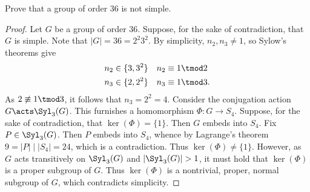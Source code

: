 \documentclass[12pt]{article}
\begin{document}
\begin{homeworkProblem}
  Prove that a group of order $36$ is not simple.

  \begin{proof}
    Let $ G $ be a group of order $ 36 $. Suppose, for the sake of contradiction, that $ G $ is simple. Note that $ |G|=36 = 2^2 3^2 $. By simplicity, $ n_{2},n_{3}\neq 1 $, so Sylow's theorems give 
    \begin{align*}
      n_{2} \in\{3,3^2\} &\quad n_{2}\equiv 1\tmod 2\\
      n_{3} \in\{2,2^2\} &\quad n_{3}\equiv 1\tmod 3.
    \end{align*}
    As $ 2\not\equiv 1\tmod 3 $, it follows that $ n_{3} = 2^{2}= 4 $. Consider the conjugation action $ G\acts \Syl_{3}(G) $. This furnishes a homomorphism $ \Phi:G\to S_{4} $. Suppose, for the sake of contradiction, that $ \ker(\Phi) = \{1\} $. Then $ G $ embeds into $ S_{4} $. Fix $ P\in \Syl_{3}(G) $. Then $ P $ embeds into $ S_{4} $, whence by Lagrange's theorem $ 9 = |P| \mid |S_{4}| = 24 $, which is a contradiction. Thus $ \ker( \Phi) \neq \{1\} $. However, as $ G $ acts transitively on $ \Syl_{3}(G) $ and $ |\Syl_{3}(G)|>1 $, it must hold that $ \ker(\Phi) $ is a proper subgroup of $ G $. Thus $ \ker(\Phi) $ is a nontrivial, proper, normal subgroup of $ G $, which contradicts simplicity.
  \end{proof}

\end{homeworkProblem}
\end{document}
